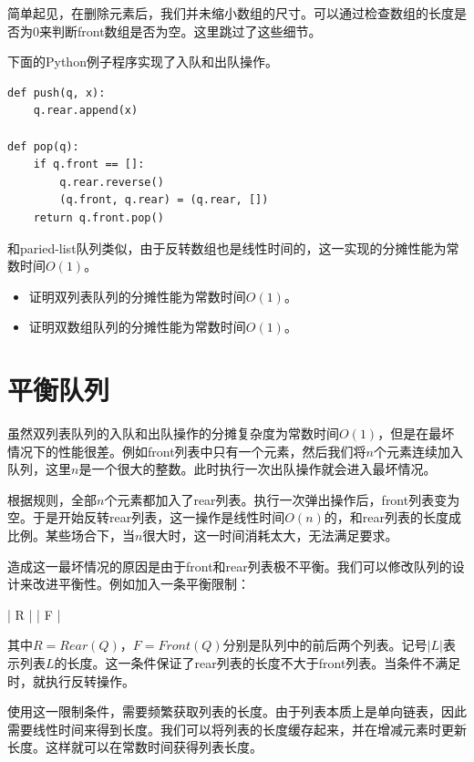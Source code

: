 \documentclass[b5paper]{ctexart}
\begin{document}
简单起见，在删除元素后，我们并未缩小数组的尺寸。可以通过检查数组的长度是否为0来判断front数组是否为空。这里跳过了这些细节。

下面的Python例子程序实现了入队和出队操作。

\begin{lstlisting}
def push(q, x):
    q.rear.append(x)

def pop(q):
    if q.front == []:
        q.rear.reverse()
        (q.front, q.rear) = (q.rear, [])
    return q.front.pop()
\end{lstlisting}

和paried-list队列类似，由于反转数组也是线性时间的，这一实现的分摊性能为常数时间$O(1)$。

\begin{Exercise}
\begin{itemize}
\item 证明双列表队列的分摊性能为常数时间$O(1)$。
\item 证明双数组队列的分摊性能为常数时间$O(1)$。
\end{itemize}
\end{Exercise}

\section{平衡队列}

虽然双列表队列的入队和出队操作的分摊复杂度为常数时间$O(1)$，但是在最坏情况下的性能很差。例如front列表中只有一个元素，然后我们将$n$个元素连续加入队列，这里$n$是一个很大的整数。此时执行一次出队操作就会进入最坏情况。

根据规则，全部$n$个元素都加入了rear列表。执行一次弹出操作后，front列表变为空。于是开始反转rear列表，这一操作是线性时间$O(n)$的，和rear列表的长度成比例。某些场合下，当$n$很大时，这一时间消耗太大，无法满足要求。

造成这一最坏情况的原因是由于front和rear列表极不平衡。我们可以修改队列的设计来改进平衡性。例如加入一条平衡限制：

\be
  | R | \leq | F |
\label{eq:balance-invariant}
\ee

其中$R = Rear(Q)$，$F = Front(Q)$分别是队列中的前后两个列表。记号$|L|$表示列表$L$的长度。这一条件保证了rear列表的长度不大于front列表。当条件不满足时，就执行反转操作。

使用这一限制条件，需要频繁获取列表的长度。由于列表本质上是单向链表，因此需要线性时间来得到长度。我们可以将列表的长度缓存起来，并在增减元素时更新长度。这样就可以在常数时间获得列表长度。
\end{document}
